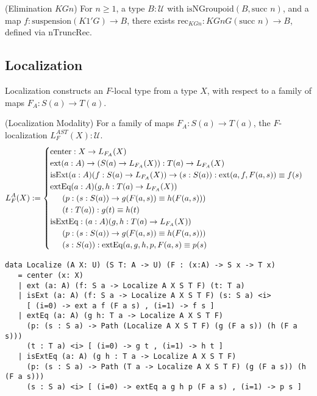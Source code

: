 \begin{theorem} (Elimination \( KGn \))
For \( n \geq 1 \), a type \( B : \mathcal{U} \) with \( \text{isNGroupoid}(B, \text{succ } n) \),
and a map \( f : \text{suspension}(K1' G) \to B \), there exists
\( \text{rec}_{KGn} : KGn G (\text{succ } n) \to B \),
defined via \( \text{nTruncRec} \).
\end{theorem}

\newpage
\subsection{Localization}
Localization constructs an \( F \)-local type from a type \( X \),
with respect to a family of maps \( F_A : S(a) \to T(a) \).

\begin{definition} (Localization Modality)
For a family of maps \( F_A : S(a) \to T(a) \),
the \( F \)-localization \( L^{AST}_F(X) : \mathcal{U} \).
\[
L^A_F(X) :=
\begin{cases}
\text{center} : X \to L_{F_A}(X) \\
\text{ext} (a : A) \to (S(a) \to L_{F_A}(X)) : T(a) \to L_{F_A}(X) \\
\text{isExt} (a : A) (f : S(a) \to L_{F_A}(X)) \to (s : S(a)) : \text{ext}(a,f,F(a,s)) \equiv f(s) \\
\text{extEq} (a : A) (g, h : T(a) \to L_{F_A}(X)) \\
\indent (p : (s : S(a)) \to g(F(a,s)) \equiv h(F(a,s))) \\
\indent (t : T(a)) : g(t) \equiv h(t) \\
\text{isExtEq} : (a : A) (g, h : T(a) \to L_{F_A}(X)) \\
\indent  (p : (s : S(a)) \to g(F(a,s)) \equiv h(F(a,s))) \\
\indent (s : S(a)) : \text{extEq}(a,g,h,p,F(a,s) \equiv p(s)
\end{cases}
\]
\begin{lstlisting}
data Localize (A X: U) (S T: A -> U) (F : (x:A) -> S x -> T x)
   = center (x: X)
   | ext (a: A) (f: S a -> Localize A X S T F) (t: T a)
   | isExt (a: A) (f: S a -> Localize A X S T F) (s: S a) <i>
     [ (i=0) -> ext a f (F a s) , (i=1) -> f s ]
   | extEq (a: A) (g h: T a -> Localize A X S T F)
     (p: (s : S a) -> Path (Localize A X S T F) (g (F a s)) (h (F a s)))
     (t : T a) <i> [ (i=0) -> g t , (i=1) -> h t ]
   | isExtEq (a: A) (g h : T a -> Localize A X S T F)
     (p: (s : S a) -> Path (T a -> Localize A X S T F) (g (F a s)) (h (F a s)))
     (s : S a) <i> [ (i=0) -> extEq a g h p (F a s) , (i=1) -> p s ]
\end{lstlisting}
\end{definition}

